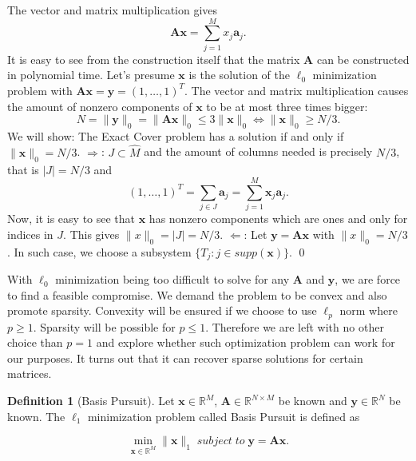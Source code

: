 \documentclass[11pt,oneside,czech,american]{book} %
\theoremstyle{plain}
\theoremstyle{definition}
\newtheorem{defn}{Definition}
\newtheorem{rmrk}{Remark}
\begin{document}
The vector and matrix multiplication gives
\begin{equation*}
	\bm{A} \bm{x}=\sum_{j=1}^{M}x_j \bm{a}_{j}.
\end{equation*}
It is easy to see from the construction itself that the matrix $\bm{A}$ can be constructed in polynomial time. Let's presume $\bm{x}$ is the solution of the $\ell_{0}$ minimization problem with $\bm{A} \bm{x}= \bm{y} = (1,\dots,1)^{T}$. The vector and matrix multiplication causes the amount of nonzero components of $\bm{x}$ to be at most three times bigger:
\begin{equation*}
	N = \lVert \bm{y} \rVert_{0} = \lVert \bm{A} \bm{x}\rVert_{0}\leq 3 \lVert \bm{x} \rVert_{0} \Leftrightarrow \lVert \bm{x} \rVert_{0} \geq N/3.
\end{equation*}
We will show: The Exact Cover problem has a solution if and only if $\lVert \bm{x} \rVert_{0} = N/3$.\newline
$\Rightarrow$: $ J \subset \hat{M}$ and the amount of columns needed is precisely $N/3$, that is $|J| = N/3$ and
\begin{equation*}
	(1,\dots,1)^{T} = \sum_{j \in J} \bm{a}_j = \sum_{j =1}^{M} \bm{x}_j \bm{a}_j.
\end{equation*}
Now, it is easy to see that $\bm{x}$ has nonzero components which are ones and only for indices in $J$. This gives $\lVert x\rVert_{0}=|J|= N/3$.
\newline
$\Leftarrow$:
Let $\bm{y}=\bm{A}\bm{x}$ with $\lVert x\rVert_{0}=N/3$. In such case, we choose a subsystem $\{T_j: j \in supp(\bm{x})\}$.
\qed

\medskip
	With $\ell_{0}$ minimization being too difficult to solve for any $\bm{A}$ and $\bm{y}$, we are force to find a feasible compromise. We demand the problem to be convex and also promote sparsity. Convexity will be ensured if we choose to use $\ell_{p}$ norm where $p\geq 1$. Sparsity will be possible for $p\leq 1$. Therefore we are left with no other choice than $p = 1$ and explore whether such optimization problem can work for our purposes. It turns out that it can recover sparse solutions for certain matrices.

\begin{defn}[Basis Pursuit]
	Let $\bm{x} \in \mathbb{R}^{M}$, $\bm{A} \in \mathbb{R}^{N \times M}$ be known and $\bm{y} \in \mathbb{R}^{N}$ be known. The $\ell_{1}$ minimization problem called Basis Pursuit is defined as
	
	\begin{equation}
		\min_{\bm{{x}} \in \mathbb{R}^{M}}\lVert \bm{x}\rVert_{1} \;subject\; to\; \bm{y} = \bm{A} \bm{x}. \label{Basis Pursuit}
	\end{equation}
\end{defn}
\end{document}

